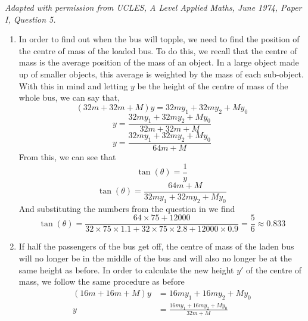 \begin{hint}[A1974AMIQ5a]
{\begin{enumerate}
{\end{enumerate}}
{}
{\textit{Adapted with permission from UCLES, A Level Applied Maths, June 1974, Paper I, Question 5.}}
{
\begin{enumerate}
	\item In order to find out when the bus will topple, we need to find the position of the centre of mass of the loaded bus. To do this, we recall that the centre of mass is the average position of the mass of an object. In a large object made up of smaller objects, this average is weighted by the mass of each sub-object. With this in mind and letting $y$ be the height of the centre of mass of the whole bus, we can say that,
		\begin{equation*}(32m+32m+M)y=32my_1+32my_2+My_0	\end{equation*}
		\begin{equation*}y=\frac{32my_1+32my_2+My_0}{32m+32m+M}	\end{equation*}
		\begin{equation*}y=\frac{32my_1+32my_2+My_0}{64m+M}	\end{equation*}
	From this, we can see that
		\begin{equation*}\tan(\theta)=\frac{1}{y}	\end{equation*}
		\begin{equation*}\tan(\theta)=\frac{64m+M}{32my_1+32my_2+My_0}	\end{equation*}
	And substituting the numbers from  the question in we find
		\begin{equation*}\tan(\theta)=\frac{64\times 75+12000}{32\times75\times1.1+32\times75\times2.8+12000\times0.9}=\frac{5}{6}\approx0.833	\end{equation*}
	\item If half the passengers of the bus get off, the centre of mass of the laden bus will no longer be in the middle of the bus and will also no longer be at the same height as before. In order to calculate the new height $y'$ of the centre of mass, we follow the same procedure as before
		\begin{align*}(16m+16m+M)y&=16my_1+16my_2+My_0	
\\				y&=\frac{16my_1+16my_2+My_0}{32m+M}\end{align*}

\end{enumerate}}
\end{hint}

